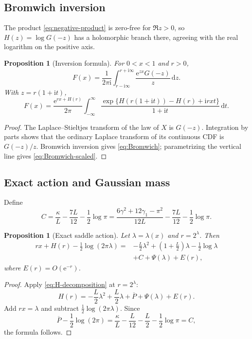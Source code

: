 \documentclass[11pt]{article}
\newtheorem{proposition}[theorem]{Proposition}
\theoremstyle{definition}
\theoremstyle{remark}
\newcommand{\dd}{\,\mathrm d}\newcommand{\e}{\mathrm e}\newcommand{\ii}{\mathrm i}
\begin{document}
\subsection{Bromwich inversion}
The product \eqref{eq:negative-product} is zero-free for $\Re z>0$, so $H(z)=\log G(-z)$ has a holomorphic branch there, agreeing with the real logarithm on the positive axis.

\begin{proposition}[Inversion formula]\label{prop:Bromwich}
For $0<x<1$ and $r>0$,
\begin{equation}\label{eq:Bromwich}
 F(x)=\frac1{2\pi\ii}\int_{r-\ii\infty}^{r+\ii\infty}
 \frac{\e^{zx}G(-z)}{z}\dd z.
\end{equation}
With $z=r(1+\ii t)$,
\begin{equation}\label{eq:Bromwich-scaled}
 F(x)=\frac{\e^{rx+H(r)}}{2\pi}
 \int_{-\infty}^{\infty}
 \frac{\exp\{H(r(1+\ii t))-H(r)+\ii rxt\}}
 {1+\ii t}\dd t.
\end{equation}
\end{proposition}
\begin{proof}
The Laplace--Stieltjes transform of the law of $X$ is $G(-z)$.  Integration by parts shows that the ordinary Laplace transform of its continuous CDF is $G(-z)/z$.  Bromwich inversion gives \eqref{eq:Bromwich}; parametrizing the vertical line gives \eqref{eq:Bromwich-scaled}.
\end{proof}

\subsection{Exact action and Gaussian mass}
Define
\begin{equation}\label{eq:C-constant}
 C=\frac\kappa L-\frac{7L}{12}-\frac12\log\pi
 =\frac{6\gamma^2+12\gamma_1-\pi^2}{12L}
 -\frac{7L}{12}-\frac12\log\pi.
\end{equation}

\begin{proposition}[Exact saddle action]\label{prop:action}
Let $\lambda=\lambda(x)$ and $r=2^\lambda$.  Then
\begin{equation}\label{eq:action}
\begin{aligned}
 rx+H(r)-\frac12\log(2\pi\lambda)
 ={}&-\frac L2\lambda^2+\left(1+\frac L2\right)\lambda
 -\frac12\log\lambda\\
 &+C+\Psi(\lambda)+E(r),
\end{aligned}
\end{equation}
where $E(r)=O(\e^{-r})$.
\end{proposition}
\begin{proof}
Apply \eqref{eq:H-decomposition} at $r=2^\lambda$:
\[
 H(r)=-\frac L2\lambda^2+\frac L2\lambda+
 \overline P+\Psi(\lambda)+E(r).
\]
Add $rx=\lambda$ and subtract $\frac12\log(2\pi\lambda)$.  Since
\[
 \overline P-\frac12\log(2\pi)
 =\frac\kappa L-\frac L{12}-\frac L2-\frac12\log\pi=C,
\]
the formula follows.
\end{proof}
\end{document}
